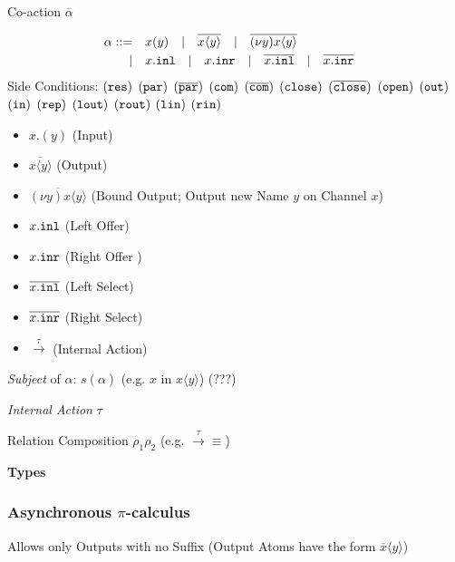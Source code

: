 Co-action $\overline{\alpha}$

\[
\begin{split}
  \alpha ::=&\quad x(y) \quad
           | \quad \overline{x \langle y \rangle} \quad
           | \quad \overline{(\nu y) x \langle y \rangle} \quad \\
           |&\quad x.\mathtt{inl} \quad
           | \quad x.\mathtt{inr} \quad
           | \quad \overline{x.\mathtt{inl}} \quad
           | \quad \overline{x.\mathtt{inr}} \quad
\end{split}
\]
Side Conditions:
$(\mathtt{res})$
$(\mathtt{par})$
$(\overline{\mathtt{par}})$
$(\mathtt{com})$
$(\overline{\mathtt{com}})$
$(\mathtt{close})$
$(\overline{\mathtt{close}})$
$(\mathtt{open})$
$(\mathtt{out})$
$(\mathtt{in})$
$(\mathtt{rep})$
$(\mathtt{lout})$
$(\mathtt{rout})$
$(\mathtt{lin})$
$(\mathtt{rin})$

\begin{itemize}
  \item $x.(y)$ (Input)
  \item $\overline{x \langle y \rangle}$ (Output)
  \item $\overline{(\nu y) x \langle y \rangle}$ (Bound Output; Output
    new Name $y$ on Channel $x$)
  \item $x.\mathtt{inl}$ (Left Offer)
  \item $x.\mathtt{inr}$ (Right Offer )
  \item $\overline{x.\mathtt{inl}}$ (Left Select)
  \item $\overline{x.\mathtt{inr}}$ (Right Select)
  \item $\xrightarrow{\tau}$ (Internal Action)
\end{itemize}

\emph{Subject} of $\alpha$: $s(\alpha)$ (e.g. $x$ in $x\langle y
\rangle$) (???) \cite{caires-pfenning10}

\emph{Internal Action} $\tau$

Relation Composition $\rho_1 \rho_2$ (e.g. $\xrightarrow{\tau}\equiv$)



\textbf{Types}



\subsubsection{Asynchronous $\pi$-calculus}
\label{sec:asynchronous_pi_calculus}

Allows only Outputs with no Suffix (Output Atoms have the form
$\overline{x}\langle y \rangle$)

